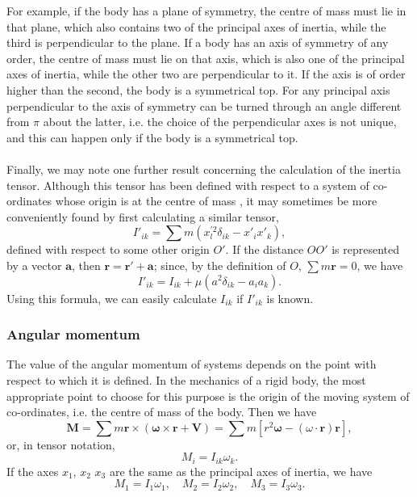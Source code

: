 For example, if the body has a plane of symmetry, the centre of mass must lie in that plane, which also contains two of the principal axes of inertia, while the third is perpendicular to the plane.
If a body has an axis of symmetry of any order, the centre of mass must lie on that axis, which is also one of the principal axes of inertia, while the other two are perpendicular to it.
If the axis is of order higher than the second, the body is a symmetrical top. For any principal axis perpendicular to the axis of symmetry can be turned through an angle different from $\pi$ about the latter, i.e. the choice of the perpendicular axes is not unique, and this can happen only if the body is a symmetrical top.
\\ \\
Finally, we may note one further result concerning the calculation of the inertia tensor. 
Although this tensor has been defined with respect to a system of co-ordinates whose origin is at the centre of mass , it may sometimes be more conveniently found by first calculating a similar tensor,
\[I'_{ik} = \sum m (x_l^{'2} \delta_{ik} - x'_i x'_k), \]
defined with respect to some other origin $O'$. 
If the distance $OO'$ is represented by a vector $\bm{a}$, then $\bm{r} = \bm{r'} + \bm{a}$; since, by the definition
of $O$, $\sum m\bm{r} = 0$, we have
\[I'_{ik} = I_{ik} + \mu (a^2\delta_{ik}-a_i a_k).\]
Using this formula, we can easily calculate $I_{ik}$ if $I'_{ik}$ is known.

\subsubsection{Angular momentum}
The value of the angular momentum of systems depends on the point with respect to which it is defined. In the mechanics of a rigid body, the most appropriate point to choose for this purpose is the origin of the moving system of co-ordinates, i.e. the centre of mass of the body. Then we have
\[\bm{M} = \sum m\bm{r} \times (\bm{\omega} \times \bm{r} + \bm{V}) = \sum m \left [ r^2\bm{\omega} - (\omega \cdot \bm{r})\bm{r} \right ],\]
or, in tensor notation,
\[M_i = I_{ik}\omega_k.\]
If the axes $x_1$, $x_2$ $x_3$ are the same as the principal axes of inertia, we have
\[M_1 = I_1 \omega_1 ,\quad M_2 = I_2 \omega_2 ,\quad M_3 = I_3 \omega_3.\]

